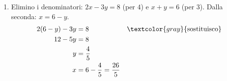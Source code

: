 \begin{question}[ID=1.4, subtitle={Sistemi lineari con parametro numerico e coefficienti frazionari}, difficulty=difficile, tags={sistemi, equazioni lineari}]
\begin{explanation}
\begin{enumerate}
\[\begin{aligned}
    15x+6y &= 39 && \textcolor{gray}{\text{seconda per $3$}}\\
    19x &= 61 && \textcolor{gray}{\text{sommo}}\\
    x &= \dfrac{61}{19}
    \end{aligned}\]
    Da $3y=2x-11$: \ $3y=\tfrac{122}{19}-\tfrac{209}{19}=-\tfrac{87}{19} \;\Rightarrow\; y=-\tfrac{29}{19}$.
    \item Elimino i denominatori: $2x-3y=8$ (per $4$) e $x+y=6$ (per $3$). Dalla seconda: $x=6-y$.
    \[\begin{aligned}
    2(6-y)-3y &= 8 && \textcolor{gray}{\text{sostituisco}}\\
    12-5y &= 8\\
    y &= \dfrac45\\
    x &= 6-\dfrac45=\dfrac{26}{5}
    \end{aligned}\]
\end{enumerate}
\end{explanation}
\end{question}


